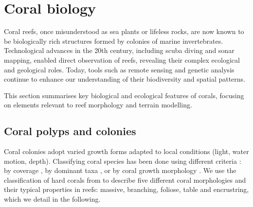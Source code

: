 \section{Coral biology}
\label{sec:state-of-the-art_biology}

Coral reefs, once misunderstood as sea plants or lifeless rocks, are now known to be biologically rich structures formed by colonies of marine invertebrates. Technological advances in the 20th century, including scuba diving and sonar mapping, enabled direct observation of reefs, revealing their complex ecological and geological roles. Today, tools such as remote sensing and genetic analysis continue to enhance our understanding of their biodiversity and spatial patterns.

This section summarises key biological and ecological features of corals, focusing on elements relevant to reef morphology and terrain modelling.

\subsection{Coral polyps and colonies}

Coral colonies adopt varied growth forms adapted to local conditions (light, water motion, depth). Classifying coral species has been done using different criteria \cite{Kovacs2020}: by coverage \cite{Kuchler1986, Bauer2009, Purkis2019}, by dominant taxa \cite{Stoddart1969}, or by coral growth morphology \cite{Mumby1999,Goltenboth2006}. We use the classification of hard corals from \cite{Goltenboth2006} to describe five different coral morphologies and their typical properties in reefs: massive, branching, foliose, table and encrustring, which we detail in the following.

